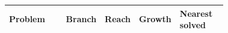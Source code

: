 \begin{tabular}{@{}p{0.42\linewidth}lrrp{0.3\linewidth}@{}}
\toprule
Problem & Branch & Reach & Growth & Nearest solved \\
\midrule
\bottomrule
\end{tabular}

